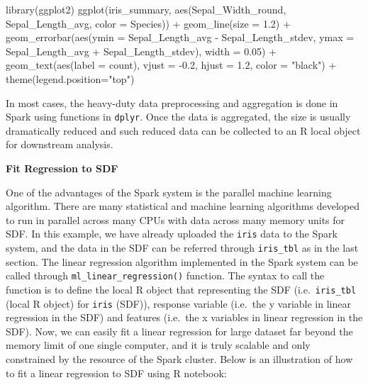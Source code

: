 \documentclass[
  12pt,
]{krantz}
\makeatletter
\newenvironment{Shaded}{\begin{snugshade}}{\end{snugshade}}
\newcommand{\AttributeTok}[1]{\textcolor[rgb]{0.61,0.61,0.61}{#1}}
\newcommand{\FloatTok}[1]{\textcolor[rgb]{0.06,0.06,0.06}{#1}}
\newcommand{\FunctionTok}[1]{\textcolor[rgb]{0,0,0}{#1}}
\newcommand{\NormalTok}[1]{#1}
\newcommand{\SpecialCharTok}[1]{\textcolor[rgb]{0,0,0}{#1}}
\newcommand{\StringTok}[1]{\textcolor[rgb]{0.5,0.5,0.5}{#1}}
\newenvironment{kframe}{%
\medskip{}
\setlength{\fboxsep}{.8em}
 \def\at@end@of@kframe{}%
 \ifinner\ifhmode%
  \def\at@end@of@kframe{\end{minipage}}%
  \begin{minipage}{\columnwidth}%
 \fi\fi%
 \def\FrameCommand##1{\hskip\@totalleftmargin \hskip-\fboxsep
 \colorbox{shadecolor}{##1}\hskip-\fboxsep
     \hskip-\linewidth \hskip-\@totalleftmargin \hskip\columnwidth}%
 \MakeFramed {\advance\hsize-\width
   \@totalleftmargin\z@ \linewidth\hsize
   \@setminipage}}%
 {\par\unskip\endMakeFramed%
 \at@end@of@kframe}
\renewenvironment{Shaded}{\begin{kframe}}{\end{kframe}}
\makeatother
\begin{document}
\begin{Shaded}
\begin{Highlighting}[]
\FunctionTok{library}\NormalTok{(ggplot2)}
\FunctionTok{ggplot}\NormalTok{(iris\_summary, }\FunctionTok{aes}\NormalTok{(Sepal\_Width\_round, }
\NormalTok{                         Sepal\_Length\_avg, }
                         \AttributeTok{color =}\NormalTok{ Species)) }\SpecialCharTok{+}
    \FunctionTok{geom\_line}\NormalTok{(}\AttributeTok{size =} \FloatTok{1.2}\NormalTok{) }\SpecialCharTok{+}
    \FunctionTok{geom\_errorbar}\NormalTok{(}\FunctionTok{aes}\NormalTok{(}\AttributeTok{ymin =}\NormalTok{ Sepal\_Length\_avg }\SpecialCharTok{{-}}\NormalTok{ Sepal\_Length\_stdev, }
                      \AttributeTok{ymax =}\NormalTok{ Sepal\_Length\_avg }\SpecialCharTok{+}\NormalTok{ Sepal\_Length\_stdev),}
                      \AttributeTok{width =} \FloatTok{0.05}\NormalTok{) }\SpecialCharTok{+}
    \FunctionTok{geom\_text}\NormalTok{(}\FunctionTok{aes}\NormalTok{(}\AttributeTok{label =}\NormalTok{ count), }
              \AttributeTok{vjust =} \SpecialCharTok{{-}}\FloatTok{0.2}\NormalTok{, }
              \AttributeTok{hjust =} \FloatTok{1.2}\NormalTok{,}
              \AttributeTok{color =} \StringTok{"black"}\NormalTok{) }\SpecialCharTok{+}
\FunctionTok{theme}\NormalTok{(}\AttributeTok{legend.position=}\StringTok{"top"}\NormalTok{)}
\end{Highlighting}
\end{Shaded}

In most cases, the heavy-duty data preprocessing and aggregation is done in Spark using functions in \texttt{dplyr}. Once the data is aggregated, the size is usually dramatically reduced and such reduced data can be collected to an R local object for downstream analysis.

\textbf{Fit Regression to SDF}

One of the advantages of the Spark system is the parallel machine learning algorithm. There are many statistical and machine learning algorithms developed to run in parallel across many CPUs with data across many memory units for SDF. In this example, we have already uploaded the \texttt{iris} data to the Spark system, and the data in the SDF can be referred through \texttt{iris\_tbl} as in the last section. The linear regression algorithm implemented in the Spark system can be called through \texttt{ml\_linear\_regression()} function. The syntax to call the function is to define the local R object that representing the SDF (i.e.~\texttt{iris\_tbl} (local R object) for \texttt{iris} (SDF)), response variable (i.e.~the y variable in linear regression in the SDF) and features (i.e.~the x variables in linear regression in the SDF). Now, we can easily fit a linear regression for large dataset far beyond the memory limit of one single computer, and it is truly scalable and only constrained by the resource of the Spark cluster. Below is an illustration of how to fit a linear regression to SDF using R notebook:
\end{document}
